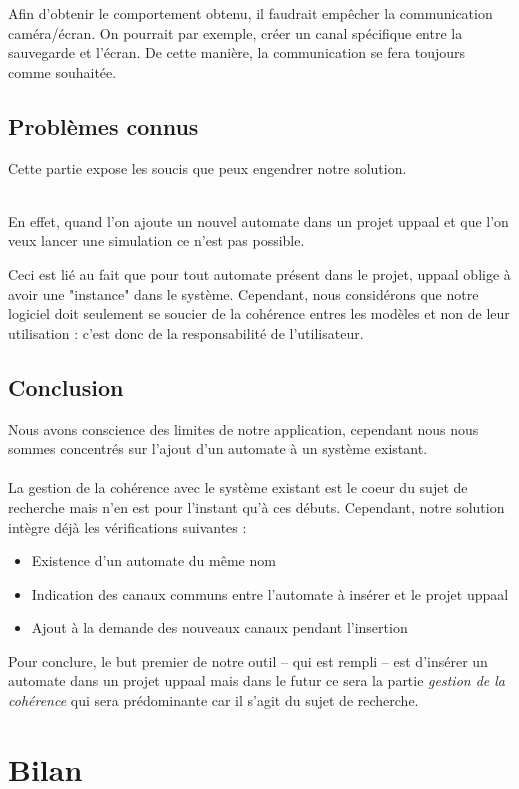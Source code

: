 \documentclass[12pt,a4paper]{report}
\begin{document}
    Afin d'obtenir le comportement obtenu, il faudrait empêcher la communication caméra/écran. On pourrait par exemple, créer un canal spécifique entre la sauvegarde et l'écran. De cette manière, la communication se fera toujours comme souhaitée.

\newpage
\section{Problèmes connus}
Cette partie expose les soucis que peux engendrer notre solution.
\\\

En effet, quand l'on ajoute un nouvel automate dans un projet uppaal et que l'on veux lancer une simulation ce n'est pas possible.

Ceci est lié au fait que pour tout automate présent dans le projet, uppaal oblige à avoir une "instance" dans le système. Cependant, nous considérons que notre logiciel doit seulement se soucier de la cohérence entres les modèles et non de leur utilisation : c'est donc de la responsabilité de l'utilisateur.

\section{Conclusion}
    Nous avons conscience des limites de notre application, cependant nous nous sommes concentrés sur l'ajout d'un automate à un système existant.
\\\\
    La gestion de la cohérence avec le système existant est le coeur du sujet de recherche mais n'en est pour l'instant qu'à ces débuts. Cependant, notre solution intègre déjà les vérifications suivantes :
    
    \begin{itemize}
    \item Existence d'un automate du même nom
    \item Indication des canaux communs entre l'automate à insérer et le projet uppaal
    \item Ajout à la demande des nouveaux canaux pendant l'insertion
    \end{itemize}
    
Pour conclure, le but premier de notre outil -- qui est rempli --  est d'insérer un automate dans un projet uppaal mais dans le futur ce sera la partie \emph{gestion de la cohérence} qui sera prédominante car il s'agit du sujet de recherche.


\chapter{Bilan}
\end{document}
